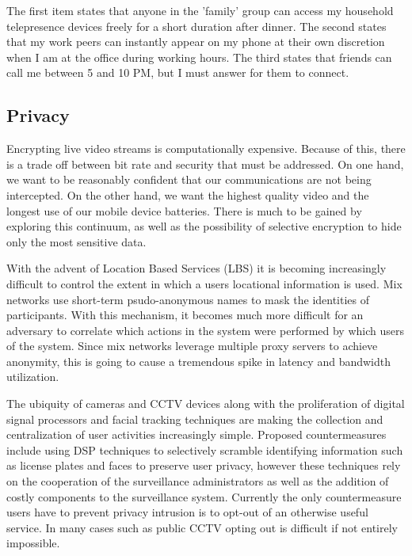 \documentclass[a4paper,12pt]{report}
\begin{document}
The first item states that anyone in the 'family' group can access my household telepresence devices freely for a short duration after dinner. The second states that my work peers can instantly appear on my phone at their own discretion when I am at the office during working hours. The third states that friends can call me between 5 and 10 PM, but I must answer for them to connect.

\subsection{Privacy}

Encrypting live video streams is computationally expensive. Because of this, there is a trade off between bit rate and security that must be addressed. On one hand, we want to be reasonably confident that our communications are not being intercepted. On the other hand, we want the highest quality video and the longest use of our mobile device batteries. There is much to be gained by exploring this continuum, as well as the possibility of selective encryption to hide only the most sensitive data.
\cite{6550384}

With the advent of Location Based Services (LBS) it is becoming increasingly difficult to control the extent in which a users locational information is used. Mix networks use short-term psudo-anonymous names to mask the identities of participants. With this mechanism, it becomes much more difficult for an adversary to correlate which actions in the system were performed by which users of the system. Since mix networks leverage multiple proxy servers to achieve anonymity, this is going to cause a tremendous spike in latency and bandwidth utilization.
\cite{6270872,freudiger2007mix,1032602}

The ubiquity of cameras and CCTV devices along with the proliferation of digital signal processors and facial tracking techniques are making the collection and centralization of user activities increasingly simple. Proposed countermeasures include using DSP techniques to selectively scramble identifying information such as license plates and faces to preserve user privacy, however these techniques rely on the cooperation of the surveillance administrators as well as the addition of costly components to the surveillance system. Currently the only countermeasure users have to prevent privacy intrusion is to opt-out of an otherwise useful service. In many cases such as public CCTV opting out is difficult if not entirely impossible.
\cite{4117949,6597703}
\end{document}
